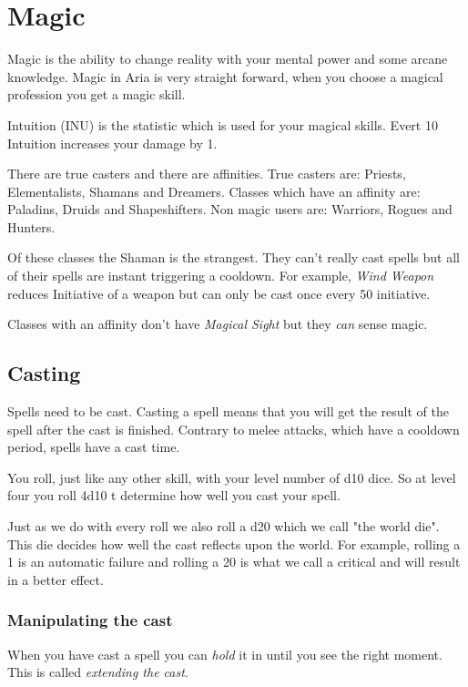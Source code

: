 
\newpage
\section{Magic}

Magic is the ability to change reality with your mental power and some arcane knowledge. Magic in Aria is very straight forward, when you choose a magical profession you get a magic skill. 

\bigskip

Intuition (INU) is the statistic which is used for your magical skills. Evert 10 Intuition increases your damage by 1.

\bigskip

There are true casters and there are affinities. True casters are: Priests, Elementalists, Shamans and Dreamers. Classes which have an affinity are: Paladins, Druids and Shapeshifters. Non magic users are: Warriors, Rogues and Hunters.

Of these classes the Shaman is the strangest. They can't really cast spells but all of their spells are instant triggering a cooldown. For example, \emph{Wind Weapon} reduces Initiative of a weapon but can only be cast once every 50 initiative.

Classes with an affinity don't have \emph{Magical Sight} but they \emph{can} sense magic. 

\subsection{Casting}
Spells need to be cast. Casting a spell means that you will get the result of the spell after the cast is finished. Contrary to melee attacks, which have a cooldown period, spells have a cast time.

You roll, just like any other skill, with your level number of d10 dice. So at level four you roll 4d10 t determine how well you cast your spell.

Just as we do with every roll we also roll a d20 which we call "the world die". This die decides how well the cast reflects upon the world. For example, rolling a 1 is an automatic failure and rolling a 20 is what we call a critical and will result in a better effect. 

\subsubsection{Manipulating the cast}
When you have cast a spell you can \emph{hold} it in until you see the right moment. This is called \emph{extending the cast}.

